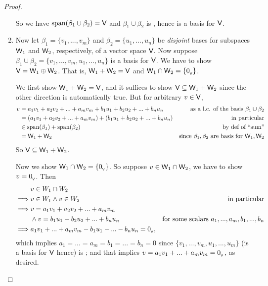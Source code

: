 \begin{proof}
\begin{enumerate}
So we have \(\operatorname{span}(\beta_1 \cup \beta_2) = \textsf{V}\) and \(\beta_1 \cup \beta_2\) is \LID{}, hence is a basis for \(\textsf{V}\).

\item
Now let \(\beta_1 = \{ v_1, ..., v_m \}\) and \(\beta_2 = \{u_1, ..., u_n \}\) be \emph{disjoint} bases for subspaces \(\textsf{W}_1\) and \(\textsf{W}_2\), respectively, of a vector space \(\textsf{V}\).
Now suppose \(\beta_1 \cup \beta_2 = \{ v_1, ..., v_m, u_1, ..., u_n \}\) is a basis for \(\textsf{V}\).
We have to show \(\textsf{V} = \textsf{W}_1 \oplus \textsf{W}_2\).
That is, \(\textsf{W}_1 + \textsf{W}_2 = \textsf{V}\) and \(\textsf{W}_1 \cap \textsf{W}_2 = \{ 0_{_{\textsf{V}}} \}\).

We first show \(\textsf{W}_1 + \textsf{W}_2 = \textsf{V}\), and it suffices to show \(\textsf{V} \subseteq \textsf{W}_1 + \textsf{W}_2\) since the other direction is automatically true.
But for arbitrary \(v \in \textsf{V}\),
\begin{align*}
    v & = a_1 v_1 + a_2 v_2 + ... + a_m v_m + b_1 u_1 + b_2 u_2 + ... + b_n u_n & \text{as a l.c. of the basis \(\beta_1 \cup \beta_2\)} \\
      & = (a_1 v_1 + a_2 v_2 + ... + a_m v_m) + (b_1 u_1 + b_2 u_2 + ... + b_n u_n) & \text{in particular} \\
      & \in \operatorname{span}(\beta_1) + \operatorname{span}(\beta_2) & \text{by def of ``sum''} \\
      & = \textsf{W}_1 + \textsf{W}_2 & \text{since \(\beta_1, \beta_2\) are basis for \(\textsf{W}_1, \textsf{W}_2\)}
\end{align*}
So \(\textsf{V} \subseteq \textsf{W}_1 + \textsf{W}_2\).

Now we show \(\textsf{W}_1 \cap \textsf{W}_2 = \{ 0_{_{\textsf{V}}} \}\).
So suppose \(v \in \textsf{W}_1 \cap \textsf{W}_2\), we have to show \(v = 0_{_{\textsf{V}}}\).
Then
\begin{align*}
             & v \in W_1 \cap W_2 \\
    \implies & v \in W_1 \land v \in W_2 & \text{in particular} \\
    \implies & v = a_1 v_1 + a_2 v_2 + ... + a_m v_m \\
             & \land v = b_1 u_1 + b_2 u_2 + ... + b_n u_n & \text{for some scalars \(a_1, ..., a_m, b_1, ..., b_n\)} \\
    \implies & a_1 v_1 + ... + a_m v_m - b_1 u_1 - ... - b_n u_n = 0_{_{\textsf{V}}},
\end{align*}
which implies \(a_1 = ... = a_m = b_1 = ... = b_n = 0\) since \(\{v_1, ..., v_m, u_1, ..., u_m\}\) (is a basis for \(\textsf{V}\) hence) is \LID{};
and that implies \(v = a_1 v_1 + ... + a_m v_m = 0_{_{\textsf{V}}}\), as desired.
\end{enumerate}
\end{proof}

